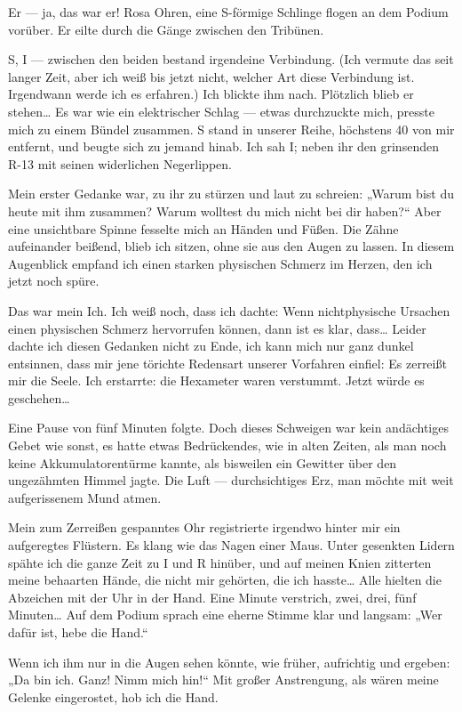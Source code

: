 Er — ja, das war er! Rosa Ohren, eine S-förmige Schlinge flogen an
dem Podium vorüber. Er eilte durch die Gänge zwischen den
Tribünen.

S, I — zwischen den beiden bestand irgendeine Verbindung. (Ich
vermute das seit langer Zeit, aber ich weiß bis jetzt nicht,
welcher Art diese Verbindung ist. Irgendwann werde ich es
erfahren.) Ich blickte ihm nach. Plötzlich
blieb er stehen\ldots{} Es war wie ein elektrischer Schlag — etwas
durchzuckte mich, presste mich zu einem Bündel zusammen. S stand in
unserer Reihe, höchstens 40\textcelsius{} von mir entfernt, und beugte sich zu
jemand hinab. Ich sah I; neben ihr den grinsenden R-13 mit seinen
widerlichen Negerlippen.

Mein erster Gedanke war, zu ihr zu stürzen und laut zu schreien:
„Warum bist du heute mit ihm zusammen? Warum wolltest du mich nicht
bei dir haben?“ Aber eine unsichtbare Spinne fesselte mich an
Händen und Füßen. Die Zähne aufeinander beißend, blieb ich sitzen,
ohne sie aus den Augen zu lassen. In diesem Augenblick empfand ich
einen starken physischen Schmerz im Herzen, den ich jetzt noch
spüre.

Das war mein Ich. Ich weiß noch, dass ich dachte: Wenn
nichtphysische Ursachen einen physischen Schmerz hervorrufen
können, dann ist es klar, dass\ldots{} Leider dachte ich diesen Gedanken
nicht zu Ende, ich kann mich nur ganz dunkel entsinnen, dass mir
jene törichte Redensart unserer Vorfahren einfiel: Es zerreißt mir
die Seele. Ich erstarrte: die Hexameter waren verstummt. Jetzt
würde es geschehen\ldots{}

Eine Pause von fünf Minuten folgte. Doch dieses Schweigen war kein
andächtiges Gebet wie sonst, es hatte etwas Bedrückendes, wie in
alten Zeiten, als man noch keine Akkumulatorentürme kannte, als
bisweilen ein Gewitter über den ungezähmten Himmel jagte. Die Luft
— durchsichtiges Erz, man möchte mit weit aufgerissenem Mund
atmen.

Mein zum Zerreißen gespanntes Ohr registrierte irgendwo hinter mir
ein aufgeregtes Flüstern. Es klang wie das Nagen einer Maus. Unter
gesenkten Lidern spähte ich die ganze Zeit zu I und R hinüber, und
auf meinen Knien
zitterten meine behaarten Hände, die nicht mir gehörten, die ich
hasste\ldots{} Alle hielten die Abzeichen mit der Uhr in der Hand. Eine
Minute verstrich, zwei, drei, fünf Minuten\ldots{} Auf dem Podium sprach
eine eherne Stimme klar und langsam: „Wer dafür ist, hebe die
Hand.“

Wenn ich ihm nur in die Augen sehen könnte, wie früher, aufrichtig
und ergeben: „Da bin ich. Ganz! Nimm mich hin!“ Mit großer
Anstrengung, als wären meine Gelenke eingerostet, hob ich die
Hand.

